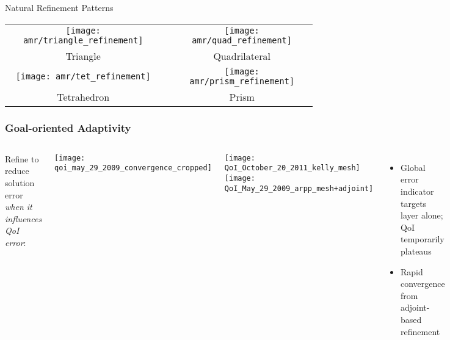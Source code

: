 \begin{frame}{Natural Refinement Patterns}
  \begin{tabular}{ccc}\\
    \texttt{[image: amr/triangle\_refinement]} &&
    \texttt{[image: amr/quad\_refinement]} \\
    Triangle && Quadrilateral \\
    \texttt{[image: amr/tet\_refinement]} &&
    \texttt{[image: amr/prism\_refinement]}  \\
    Tetrahedron && Prism
  \end{tabular}
\end{frame}


\begin{frame}
\frametitle{Goal-oriented Adaptivity}

\begin{columns}

Refine to reduce solution error {\emph{when it influences QoI error}}:

\begin{center}
\texttt{[image: qoi\_may\_29\_2009\_convergence\_cropped]}
\end{center}


\begin{center}
\texttt{[image: QoI\_October\_20\_2011\_kelly\_mesh]}
\texttt{[image: QoI\_May\_29\_2009\_arpp\_mesh+adjoint]}
\end{center}

\begin{itemize}
\item Global error indicator targets layer alone; QoI temporarily plateaus
\item Rapid convergence from adjoint-based refinement
\end{itemize}

\end{columns}

\end{frame}


